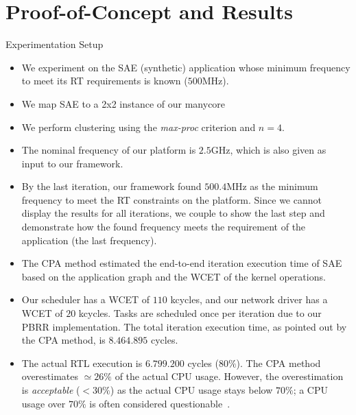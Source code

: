 \section{Proof-of-Concept and Results}

\begin{frame}{Experimentation Setup}
  
  \begin{itemize}
  	\item We experiment on the SAE (synthetic) application whose minimum frequency to meet its RT requirements is known ($500$MHz).
  	\item We map SAE to a 2x2 instance of our manycore
	\item We perform clustering using the \textit{max-proc} criterion and $n = 4$.
	\item The nominal frequency of our platform is $2.5$GHz, which is also given as input to our framework. 
	\item By the last iteration, our framework found $500.4$MHz as the minimum frequency to meet the RT constraints on the platform. Since we cannot display the results for all iterations, we couple to show the last step and demonstrate how the found frequency meets the requirement of the application (the last frequency).
  \end{itemize}
  
\end{frame}


\begin{frame}
	
	\begin{itemize}
		\item The CPA method estimated the end-to-end iteration execution time of SAE based on the application graph and the WCET of the kernel operations. 
		
		\item Our scheduler has a WCET of $110$ kcycles, and our network driver has a WCET of $20$ kcycles. Tasks are scheduled once per iteration due to our PBRR implementation. The total iteration execution time, as pointed out by the CPA method, is $8.464.895$ cycles. 
		
		\item The actual RTL execution is $6.799.200$ cycles ($80\%$). The CPA method overestimates $\simeq 26\%$ of the actual CPU usage. However, the overestimation is \textit{acceptable} ($<30\%$) as the actual CPU usage stays below  $70\%$; a CPU usage over $70\%$ is often considered questionable~\cite{Ovaska:2011}.
		
	\end{itemize}
	

\end{frame}


